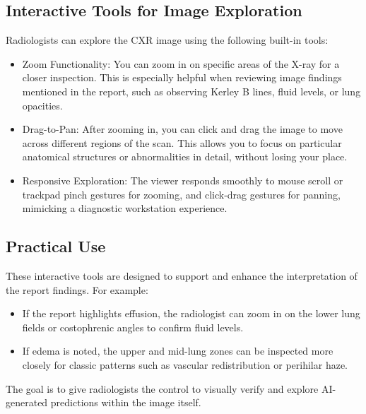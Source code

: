 \documentclass[12pt]{article}
\begin{document}
\subsection{Interactive Tools for Image Exploration}

Radiologists can explore the CXR image using the following built-in tools:

\begin{itemize}
    \item Zoom Functionality: You can zoom in on specific areas of the X-ray for a closer inspection. This is especially helpful when reviewing image findings mentioned in the report, such as observing Kerley B lines, fluid levels, or lung opacities.
    \item Drag-to-Pan: After zooming in, you can click and drag the image to move across different regions of the scan. This allows you to focus on particular anatomical structures or abnormalities in detail, without losing your place.
    \item Responsive Exploration: The viewer responds smoothly to mouse scroll or trackpad pinch gestures for zooming, and click-drag gestures for panning, mimicking a diagnostic workstation experience.
\end{itemize}

\subsection{Practical Use}

These interactive tools are designed to support and enhance the interpretation of the report findings. For example:

\begin{itemize}
    \item If the report highlights effusion, the radiologist can zoom in on the lower lung fields or costophrenic angles to confirm fluid levels.
    \item If edema is noted, the upper and mid-lung zones can be inspected more closely for classic patterns such as vascular redistribution or perihilar haze.
\end{itemize}

The goal is to give radiologists the control to visually verify and explore AI-generated predictions within the image itself.
\end{document}
